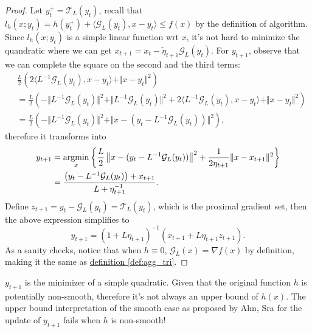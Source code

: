         \begin{proof}
            Let $y_t^+ = \mathcal T_L(y_t)$, recall that $l_h(x; y_t) = h(y_t^+) + \langle \mathcal G_L(y_t), x -y_t\rangle \le f(x)$ by the definition of algorithm. 
            Since $l_h(x; y_t)$ is a simple linear function wrt $x$, it's not hard to minimize the quandratic where we can get $x_{t + 1} = x_t - \tilde\eta_{t + 1} \mathcal G_L(y_t)$. 
            For $y_{t + 1}$, observe that we can complete the square on the second and the third terms: 
            \begin{align*}
                & \frac{L}{2}\left(
                    2\langle L^{-1}\mathcal G_L(y_t), x - y_t\rangle + 
                    \Vert x - y_t\Vert^2
                \right)
                \\
                &= 
                \frac{L}{2}
                \left(
                    - \Vert L^{-1} \mathcal G_L(y_t)\Vert^2  
                    + \Vert L^{-1} \mathcal G_L(y_t)\Vert^2 
                    + 
                    2\langle L^{-1} \mathcal G_L(y_t), x - y_t\rangle + 
                    \Vert x - y_t\Vert^2
                \right)
                \\
                &= \frac{L}{2}\left(
                    - \Vert L^{-1}\mathcal G_L(y_t)\Vert^2  
                    + \Vert x - (y_t - L^{-1}\mathcal G_L(y_t))
                    \Vert^2
                \right), 
            \end{align*}
            therefore it transforms into 
            \begin{align*}
                y_{t + 1} &=\mathop{\rm argmin}\limits_{x} \left\lbrace
                \frac{L}{2}\left\Vert 
                    x - (y_t - L^{-1}\mathcal G_L(y_t))
                \right\Vert^2
                + \frac{1}{2\eta_{t + 1}}\Vert x - x_{t + 1}\Vert^2
                \right\rbrace
                \\
                &=
                \frac{
                    \left(y_t - L^{-1}\mathcal G_L(y_t)\right) + x_{t + 1}
                }{L + \eta_{t + 1}^{-1}}.
            \end{align*}
            Define $z_{t + 1} = y_t - \mathcal G_L(y_t) = \mathcal T_L(y_t)$, which is the proximal gradient set, then the above expression simplifies to 
            $$
            y_{t + 1} = (1 + L\eta_{t +1})^{-1}(x_{t + 1}+ L\eta_{t + 1}z_{t + 1}). 
            $$
            As a sanity checks, notice that when 
            $h \equiv 0$, 
            $\mathcal G_L(x) = \nabla f(x)$ 
            by definition, making it the same as 
            \hyperref[def:agg_tri]{definition \ref*{def:agg_tri}}. 
        \end{proof}
        \begin{remark}
            $y_{t + 1}$ is the minimizer of a simple quadratic. 
            Given that the original function $h$ is potentially non-smooth, therefore it's not always an upper bound of $h(x)$. 
            The upper bound interpretation of the smooth case as proposed by Ahn, Sra for the update of $y_{t + 1}$ fails when $h$ is non-smooth! 
        \end{remark}

